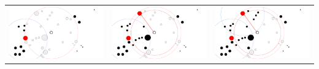 \documentclass[]{article}
\begin{document}
\begin{table}
\begin{tabular}{c|c|c}
			\includegraphics[scale = 0.15]{images/RR7.png} & \includegraphics[scale = 0.15]{images/RR8.png} & \includegraphics[scale = 0.15]{images/RR9.png}\\
						

\end{tabular}
\end{table}
\end{document}
